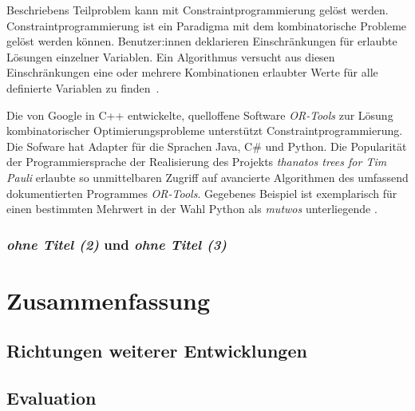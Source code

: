 \documentclass[12pt,a4paper,ngerman]{article}
\begin{document}
\bigskip

Beschriebens Teilproblem kann mit Constraintprogrammierung gelöst werden.
Constraintprogrammierung ist ein Paradigma mit dem kombinatorische Probleme gelöst werden können.
Benutzer:innen deklarieren Einschränkungen für erlaubte Lösungen einzelner Variablen.
Ein Algorithmus versucht aus diesen Einschränkungen eine oder mehrere Kombinationen erlaubter Werte für alle definierte Variablen zu finden~\parencite{constraintProgramming}.

\bigskip

Die von Google in C++ entwickelte, quelloffene Software \emph{OR-Tools} zur Lösung kombinatorischer Optimierungsprobleme unterstützt Constraintprogrammierung.
Die Sofware hat Adapter für die Sprachen Java, C\# und Python.
Die Popularität der Programmiersprache der Realisierung des Projekts \emph{thanatos trees for Tim Pauli} erlaubte so unmittelbaren Zugriff auf avancierte Algorithmen des umfassend dokumentierten Programmes \emph{OR-Tools}.
Gegebenes Beispiel ist exemplarisch für einen bestimmten Mehrwert in der Wahl Python als \emph{mutwos} unterliegende \emph{}.


%
%



\subsubsection{\emph{ohne Titel (2)} und \emph{ohne Titel (3)}}


\section{Zusammenfassung}

\subsection{Richtungen weiterer Entwicklungen}

\subsection{Evaluation}

\newpage

\printbibliography

\newpage

\appendix


\newpage

\listoffigures
\end{document}
